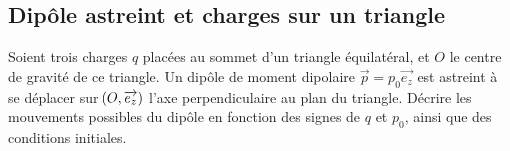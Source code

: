 \documentclass[a4paper,french,bookmarks]{book}
\begin{document}
    
    \subsection{Dipôle astreint et charges sur un triangle}
    
    Soient trois charges $q$ placées au sommet d'un triangle équilatéral, et $O$ le centre de gravité de ce triangle. Un dipôle de moment dipolaire $\vec p = p_0 \vec{e_z}$ est astreint à se déplacer sur $\!\left(O, \overrightarrow{e_z}\right)$ l'axe perpendiculaire au plan du triangle. Décrire les mouvements possibles du dipôle en fonction des signes de $q$ et $p_0$, ainsi que des conditions initiales.
    
\end{document}
